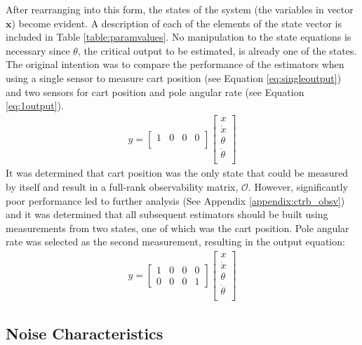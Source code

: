\documentclass{article}
\newcommand{\matr}[1]{\bm{#1}}     %
\begin{document}
After rearranging into this form, the states of the system (the variables in vector $\matr{x}$) become evident. A description of each of the elements of the state vector is included in Table \ref{table:paramvalues}. No manipulation to the state equations is necessary since $\theta$, the critical output to be estimated, is already one of the states.\\

The original intention was to compare the performance of the estimators when using a single sensor to measure cart position (see Equation \ref{eq:singleoutput}) and two sensors for cart position and pole angular rate (see Equation \ref{eq:1output}). 
 \begin{align}
 y = \begin{bmatrix}
 1 & 0 & 0 & 0 \\
 \end{bmatrix} \begin{bmatrix}
 	x \\
 	\dot{x} \\
 	\theta \\
 	\dot{\theta} \\
 \end{bmatrix}
 \label{eq:singleoutput}
 \end{align}
 It was determined that cart position was the only state that could be measured by itself and result in a full-rank observability matrix, $\mathcal{O}$. However, significantly poor performance led to further analysis (See Appendix \ref{appendix:ctrb_obsv}) and it was determined that all subsequent estimators should be built using measurements from two states, one of which was the cart position. Pole angular rate was selected as the second measurement, resulting in the output equation:
\begin{align}
y = \begin{bmatrix}
1 & 0 & 0 & 0 \\
0 & 0 & 0 & 1
\end{bmatrix} \begin{bmatrix}
	x \\
	\dot{x} \\
	\theta \\
	\dot{\theta} \\
\end{bmatrix}
\label{eq:1output}
\end{align}

\subsection{Noise Characteristics}
\end{document}
